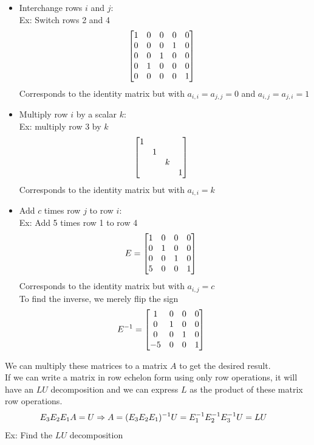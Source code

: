 \documentclass[11pt, fleqn]{article}
\begin{document}
\begin{itemize}
    \item Interchange rows $i$ and $j$:\\
    Ex: Switch rows 2 and 4
    \begin{align*}
        &\matrixx{1 &0&0&0&0\\0& 0 &0&1&0\\0&0&1&0&0\\0&1&0&0&0\\0&0&0&0& 1}
    \end{align*}
    Corresponds to the identity matrix but with $a_{i,i}=a_{j,j}=0$ and $a_{i,j}=a_{j,i}=1$
    \item Multiply row $i$ by a scalar $k$:\\
    Ex: multiply row 3 by $k$
    \begin{align*}
       &\matrixx{1 & & & \\ & 1 & & \\ & & k & \\ & & & 1}
    \end{align*}
    Corresponds to the identity matrix but with $a_{i,i}=k$
    \item Add $c$ times row $j$ to row $i$:\\
    Ex: Add 5 times row 1 to row 4
    \begin{align*}
        &E=\matrixx{1&0&0&0\\0&1&0&0\\0&0&1&0\\5&0&0&1}
    \end{align*}
    Corresponds to the identity matrix but with $a_{i,j}=c$\\
    To find the inverse, we merely flip the sign
    \begin{align*}
        &E^{-1}=\matrixx{1&0&0&0\\0&1&0&0\\0&0&1&0\\-5&0&0&1}
    \end{align*}
\end{itemize}
We can multiply these matrices to a matrix $A$ to get the desired result.\\
If we can write a matrix in row echelon form using only row operations, it will have an $LU$ decomposition and we can express $L$ as the product of these matrix row operations.
\begin{align*}
    &E_3E_2E_1A=U\Rightarrow A=(E_3E_2E_1)^{-1}U=E_1^{-1}E_2^{-1}E_3^{-1}U=LU
\end{align*}
Ex: Find the $LU$ decomposition
\end{document}
